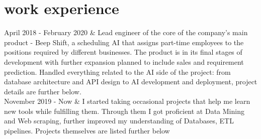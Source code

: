 \documentclass[]{cv-roald}
\begin{document}
\section*{work experience}
\begin{tabularcv}
   April 2018 - February 2020       &   
                    \newline Lead engineer of the core of the company's main product - Beep Shift, a scheduling AI that assigns part-time employees to the positions required by different businesses. The product is in its final stages of development with further expansion planned to include sales and requirement prediction.
                    \newline Handled everything related to the AI side of the project: from database architecture and API design to AI development and deployment, project details are further below.
                    \\[\vspacepar]
  November 2019 - Now   & 
                    \newline I started taking occasional projects that help me learn new tools while fulfilling them. Through them I got proficient at Data Mining and Web scraping, further improved my understanding of Databases, ETL pipelines. Projects themselves are listed further below

\end{tabularcv}
\end{document}
